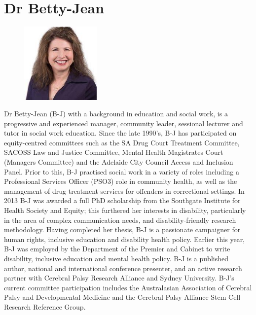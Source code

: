 \documentclass[twoside,14pt,a4paper,notitlepage]{memoir}
\begin{document}
\section*{Dr Betty-Jean}

\begin{figure}
\centering
\includegraphics[width=0.35\textwidth]{betty_jean.jpg}
\end{figure}

Dr Betty-Jean (B-J) with a background in education and social work, is a progressive and experienced manager, community leader, sessional lecturer and tutor in social work education.  Since the late 1990’s, B-J has participated on equity-centred committees such as the SA Drug Court Treatment Committee, SACOSS Law and Justice Committee, Mental Health Magistrates Court (Managers Committee) and the Adelaide City Council Access and Inclusion Panel.  Prior to this, B-J practised social work in a variety of roles including a Professional Services Officer (PSO3) role in community health, as well as the management of drug treatment services for offenders in correctional settings. In 2013 B-J was awarded a full PhD scholarship from the Southgate Institute for Health Society and Equity; this furthered her interests in disability, particularly in the area of complex communication needs, and disability-friendly research methodology. Having completed her thesis, B-J is a passionate campaigner for human rights, inclusive education and disability health policy. Earlier this year, B-J was employed by the Department of the Premier and Cabinet to write disability, inclusive education and mental health policy.  B-J is a published author, national and international conference presenter, and an active research partner with Cerebral Palsy Research Alliance and Sydney University.  B-J’s current committee participation includes the Australasian Association of Cerebral Palsy and Developmental Medicine and the Cerebral Palsy Alliance Stem Cell Research Reference Group.
\vfill
\end{document}
